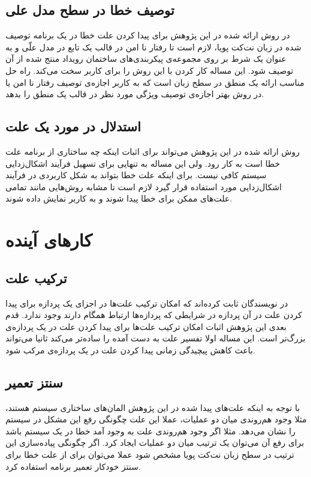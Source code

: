 \documentclass[
msc,
irfonts
]{./tex/tehran-thesis}
\newcommand{\پ}{پروژه/پایان‌نامه/رساله }
\theoremstyle{definition}
\theoremstyle{theorem}
\theoremstyle{definition}
\numberwithin{algorithm}{chapter}
\begin{document}
\subsection{توصیف خطا در سطح مدل علی}
در روش ارائه شده در این پژوهش برای پیدا کردن علت خطا در یک برنامه توصیف شده در زبان نت‌کت پویا، لازم است تا رفتار نا امن در قالب یک تابع در مدل علّی و به عنوان یک شرط بر روی مجموعه‌ی پیکربندی‌های ساختمان رویداد منتج شده از‌ آن توصیف شود.
این مساله کار کردن با این روش را برای کاربر سخت می‌کند. 
راه حل مناسب ارائه یک منطق در سطح زبان است که به کاربر اجازه‌ی توصیف رفتار نا امن یا در روش بهتر اجازه‌ی توصیف ویژگی مورد نظر در قالب یک منطق را بدهد.

\subsection{استدلال در مورد یک علت}
روش ارائه شده در این پژوهش می‌تواند برای اثبات اینکه چه ساختاری از برنامه علت خطا است به کار رود. 
ولی این مساله به تنهایی برای تسهیل فرآیند اشکال‌زدایی سیستم کافی نیست.
برای اینکه علت خطا بتواند به شکل کاربردی در فرآیند اشکال‌زدایی مورد استفاده قرار گیرد لازم است تا مشابه روش‌هایی مانند
\cite{chockler}
تمامی علت‌های ممکن برای خطا پیدا شوند و به کاربر نمایش داده شوند.

\section{کار‌های آینده}

\subsection{ترکیب علت}
در 
\cite{causal-hml}
نویسندگان ثابت کرده‌اند که امکان ترکیب علت‌ها در اجزای یک پردازه برای پیدا کردن علت در آن پردازه در شرایطی که پردازه‌ها ارتباط  
همگام دارند وجود ندارد.
قدم بعدی این پژوهش اثبات امکان ترکیب علت‌ها برای پیدا کردن علت در یک پردازه‌ی بزرگ‌تر است.
این مساله اولا تفسیر علت به دست آمده را ساده‌تر می‌کند ثانیا می‌تواند باعث کاهش پیچیدگی زمانی پیدا کردن علت در یک پردازه‌ی مرکب شود.

\subsection{سنتز تعمیر}
با توجه به اینکه علت‌های پیدا شده در این پژوهش المان‌های ساختاری سیستم هستند، مثلا وجود هم‌روندی میان دو عملیات، عملا این علت چگونگی رفع این مشکل در سیستم‌ را نشان می‌دهد. مثلا اگر وجود هم‌روندی علت به وجود آمد خطا در یک سیستم باشد برای رفع آن می‌توان یک ترتیب میان دو عملیات ایجاد کرد.
اگر چگونگی پیاده‌سازی این ترتیب در سطح زبان نت‌کت پویا مشخص شود عملا می‌توان برای از علت خطا برای سنتز خودکار تعمیر برنامه استفاده کرد.
\end{document}
